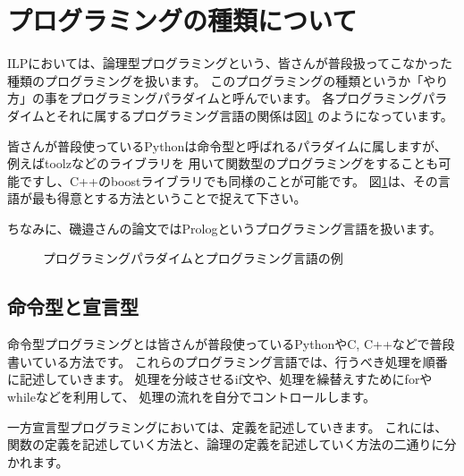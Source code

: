 \documentclass[a4j,dvipdfmx]{jsarticle}
\begin{document}
\section{プログラミングの種類について}
ILPにおいては、論理型プログラミングという、皆さんが普段扱ってこなかった種類のプログラミングを扱います。
このプログラミングの種類というか「やり方」の事をプログラミングパラダイムと呼んでいます。
各プログラミングパラダイムとそれに属するプログラミング言語の関係は図\ref{fig:programming_paradigms}
のようになっています。

皆さんが普段使っているPythonは命令型と呼ばれるパラダイムに属しますが、例えばtoolzなどのライブラリを
用いて関数型のプログラミングをすることも可能ですし、C++のboostライブラリでも同様のことが可能です。
図\ref{fig:programming_paradigms}は、その言語が最も得意とする方法ということで捉えて下さい。

ちなみに、磯邉さんの論文ではPrologというプログラミング言語を扱います。

\begin{figure}[htbp]
\centering
{}
\caption{プログラミングパラダイムとプログラミング言語の例}
\label{fig:programming_paradigms}
\end{figure}

\subsection{命令型と宣言型}
命令型プログラミングとは皆さんが普段使っているPythonやC, C++などで普段書いている方法です。
これらのプログラミング言語では、行うべき処理を順番に記述していきます。
処理を分岐させるif文や、処理を繰替えすためにforやwhileなどを利用して、
処理の流れを自分でコントロールします。

一方宣言型プログラミングにおいては、定義を記述していきます。
これには、関数の定義を記述していく方法と、論理の定義を記述していく方法の二通りに分かれます。
\end{document}
